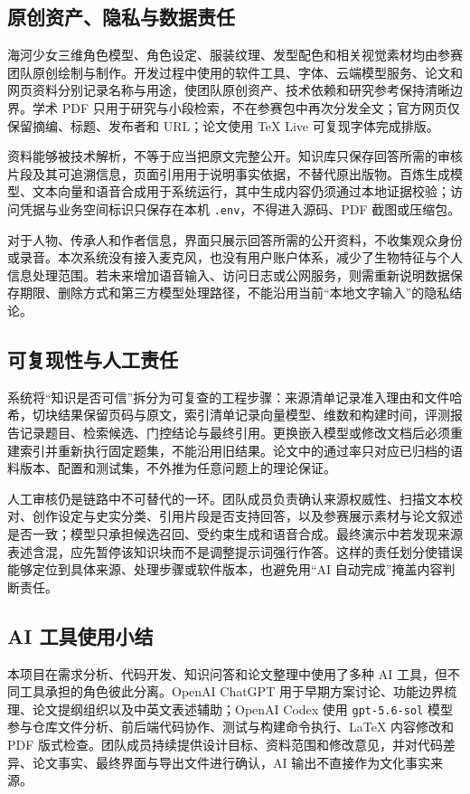 \documentclass[UTF8,zihao=-4,fontset=none,twoside]{ctexart}
\newcommand{\code}[1]{\mbox{\texttt{#1}}\nobreak}
\begin{document}
\subsection{原创资产、隐私与数据责任}

海河少女三维角色模型、角色设定、服装纹理、发型配色和相关视觉素材均由参赛团队原创绘制与制作。开发过程中使用的软件工具、字体、云端模型服务、论文和网页资料分别记录名称与用途，使团队原创资产、技术依赖和研究参考保持清晰边界。学术 PDF 只用于研究与小段检索，不在参赛包中再次分发全文；官方网页仅保留摘编、标题、发布者和 URL；论文使用 TeX Live 可复现字体完成排版。

资料能够被技术解析，不等于应当把原文完整公开。知识库只保存回答所需的审核片段及其可追溯信息，页面引用用于说明事实依据，不替代原出版物。百炼生成模型、文本向量和语音合成用于系统运行，其中生成内容仍须通过本地证据校验；访问凭据与业务空间标识只保存在本机 \code{.env}，不得进入源码、PDF 截图或压缩包。

对于人物、传承人和作者信息，界面只展示回答所需的公开资料，不收集观众身份或录音。本次系统没有接入麦克风，也没有用户账户体系，减少了生物特征与个人信息处理范围。若未来增加语音输入、访问日志或公网服务，则需重新说明数据保存期限、删除方式和第三方模型处理路径，不能沿用当前“本地文字输入”的隐私结论。

\subsection{可复现性与人工责任}

系统将“知识是否可信”拆分为可复查的工程步骤：来源清单记录准入理由和文件哈希，切块结果保留页码与原文，索引清单记录向量模型、维数和构建时间，评测报告记录题目、检索候选、门控结论与最终引用。更换嵌入模型或修改文档后必须重建索引并重新执行固定题集，不能沿用旧结果。论文中的通过率只对应已归档的语料版本、配置和测试集，不外推为任意问题上的理论保证。

人工审核仍是链路中不可替代的一环。团队成员负责确认来源权威性、扫描文本校对、创作设定与史实分类、引用片段是否支持回答，以及参赛展示素材与论文叙述是否一致；模型只承担候选召回、受约束生成和语音合成。最终演示中若发现来源表述含混，应先暂停该知识块而不是调整提示词强行作答。这样的责任划分使错误能够定位到具体来源、处理步骤或软件版本，也避免用“AI 自动完成”掩盖内容判断责任。

\subsection{AI 工具使用小结}

本项目在需求分析、代码开发、知识问答和论文整理中使用了多种 AI 工具，但不同工具承担的角色彼此分离。OpenAI ChatGPT 用于早期方案讨论、功能边界梳理、论文提纲组织以及中英文表述辅助；OpenAI Codex 使用 \code{gpt-5.6-sol} 模型参与仓库文件分析、前后端代码协作、测试与构建命令执行、LaTeX 内容修改和 PDF 版式检查。团队成员持续提供设计目标、资料范围和修改意见，并对代码差异、论文事实、最终界面与导出文件进行确认，AI 输出不直接作为文化事实来源。
\end{document}
